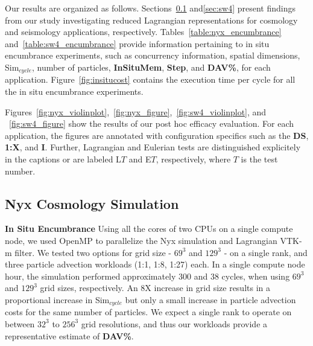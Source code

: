 Our results are organized as follows.
%
Sections~\ref{sec:nyx} and\ref{sec:sw4} present findings from our study investigating reduced Lagrangian representations for cosmology and seismology applications, respectively.
%
%
%
Tables~\ref{table:nyx_encumbrance} and~\ref{table:sw4_encumbrance} provide information pertaining to in situ encumbrance experiments, such as concurrency information, spatial dimensions, Sim$_{cycle}$, number of particles, \textbf{InSituMem}, \textbf{Step}, and \textbf{DAV\%}, for each application. 
%
Figure~\ref{fig:insitucost} contains the execution time per cycle for all the in situ encumbrance experiments. %
%

%
Figures~\ref{fig:nyx_violinplot},~\ref{fig:nyx_figure},~\ref{fig:sw4_violinplot}, and ~\ref{fig:sw4_figure} show the results of our post hoc efficacy evaluation.
%
For each application, the figures are annotated with configuration specifics such as the \textbf{DS}, \textbf{1:X}, and \textbf{I}.
%
Further, Lagrangian and Eulerian tests are distinguished explicitely in the captions or are labeled L$T$ and E$T$, respectively, where $T$ is the test number.
%

\vspace{-1mm}
\subsection{Nyx Cosmology Simulation}
\label{sec:nyx}
\noindent\textbf{In Situ Encumbrance}
Using all the cores of two CPUs on a single compute node, we used OpenMP to parallelize the Nyx simulation and Lagrangian VTK-m filter.
%
We tested two options for grid size - $69^{3}$ and $129^{3}$ - on a single rank, and three particle advection workloads (1:1, 1:8, 1:27) each.
%
In a single compute node hour, the simulation performed approximately 300 and 38 cycles, when using $69^{3}$ and $129^{3}$ grid sizes, respectively.
%
%
An 8X increase in grid size results in a proportional increase in Sim$_{cycle}$ but only a small increase in particle advection costs for the same number of particles.
%
We expect a single rank to operate on between $32^{3}$ to $256^{3}$ grid resolutions, and thus our workloads provide a representative estimate of \textbf{DAV\%}.
%

